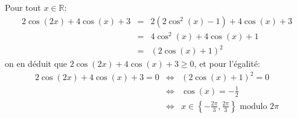 Pour tout $x\in\mathbb{R}$:
\begin{eqnarray*}
  2\cos(2x)+4\cos(x)+3 &=& 2\left( 2\cos^2(x)-1\right)+4\cos(x)+3 \\
  &=& 4\cos^2(x)+4\cos(x)+1 \\
  &=& \left(2\cos(x)+1\right)^2
\end{eqnarray*}
 on en déduit que $2\cos(2x)+4\cos(x)+3 \geq 0$, et pour l'égalité:
 \begin{eqnarray*}
   2\cos(2x)+4\cos(x)+3 = 0 &\Leftrightarrow & \left(2\cos(x)+1\right)^2 = 0 \\
   & \Leftrightarrow & \cos(x) = -\frac{1}{2} \\
   & \Leftrightarrow & x\in \left\lbrace -\frac{2\pi}{3}, \frac{2\pi}{3} \right\rbrace \textrm{ modulo } 2\pi
 \end{eqnarray*}
